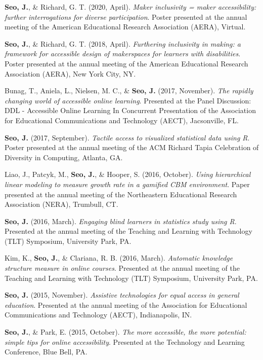 \documentclass[11pt,a4paper,]{awesome-cv}
\begin{document}
\textbf{Seo, J.}, \& Richard, G. T. (2020, April). \emph{Maker
inclusivity = maker accessibility: further interrogations for diverse
participation}. Poster presented at the annual meeting of the American
Educational Research Association (AERA), Virtual.

\textbf{Seo, J.}, \& Richard, G. T. (2018, April). \emph{Furthering
inclusivity in making: a framework for accessible design of makerspaces
for learners with disabilities}. Poster presented at the annual meeting
of the American Educational Research Association (AERA), New York City,
NY.

Bunag, T., Aniela, L., Nielsen, M. C., \& \textbf{Seo, J.} (2017,
November). \emph{The rapidly changing world of accessible online
learning}. Presented at the Panel Discussion: DDL - Accessible Online
Learning In Concurrent Presentation of the Association for Educational
Communications and Technology (AECT), Jacsonville, FL.

\textbf{Seo, J.} (2017, September). \emph{Tactile access to visualized
statistical data using R}. Poster presented at the annual meeting of the
ACM Richard Tapia Celebration of Diversity in Computing, Atlanta, GA.

Liao, J., Patcyk, M., \textbf{Seo, J.}, \& Hooper, S. (2016, October).
\emph{Using hierarchical linear modeling to measure growth rate in a
gamified CBM environment}. Paper presented at the annual meeting of the
Northeastern Educational Research Association (NERA), Trumbull, CT.

\textbf{Seo, J.} (2016, March). \emph{Engaging blind learners in
statistics study using R}. Presented at the annual meeting of the
Teaching and Learning with Technology (TLT) Symposium, University Park,
PA.

Kim, K., \textbf{Seo, J.}, \& Clariana, R. B. (2016, March).
\emph{Automatic knowledge structure measure in online courses}.
Presented at the annual meeting of the Teaching and Learning with
Technology (TLT) Symposium, University Park, PA.

\textbf{Seo, J.} (2015, November). \emph{Assistive technologies for
equal access in general education}. Presented at the annual meeting of
the Association for Educational Communications and Technology (AECT),
Indianapolis, IN.

\textbf{Seo, J.}, \& Park, E. (2015, October). \emph{The more
accessible, the more potential: simple tips for online accessibility}.
Presented at the Technology and Learning Conference, Blue Bell, PA.
\end{document}
